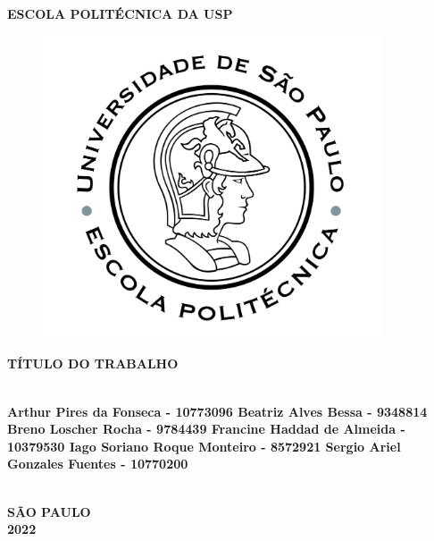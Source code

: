 \thispagestyle{empty}

\vfill
 \begin{center}

    {\large\bfseries ESCOLA POLITÉCNICA DA USP} \\
    \vspace*{1in}
    \begin{figure}[h]
     \centering
            \includegraphics[width=10cm]{figures/Logo_Poli.jpg}\\
     \end{figure}
    \vspace*{1.5cm}
    \large\bfseries{TÍTULO DO TRABALHO} \\
    \vspace*{1.5cm}
    \noindent \\
    \begin{large} 
        \bfseries 
        Arthur Pires da Fonseca 			- 	10773096
        \linebreak 
        Beatriz Alves Bessa 			- 	9348814
        \linebreak 
        Breno Loscher Rocha 			- 	9784439
        \linebreak 
        Francine Haddad de Almeida 		- 	10379530
        \linebreak 
        Iago Soriano Roque Monteiro 		- 	8572921
        \linebreak 
        Sergio Ariel Gonzales Fuentes		- 	10770200
    \end{large}\\
    \vfill
    \large\bfseries{ SÃO PAULO \\ 2022}
\end{center}

\normalsize